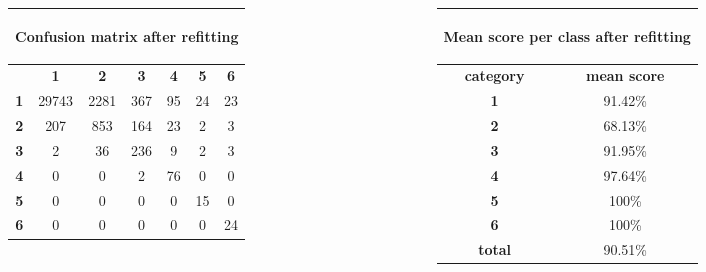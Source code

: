 \documentclass[c]{beamer}
\begin{document}
\begin{frame}
\begin{columns}
\begin{column}{0.7\textwidth}
  \begin{table}
  \begin{center}
  \begin{adjustbox}{max width=0.6\textwidth}
  {\tiny
  \begin{tabular}{|c|c|c|c|c|c|c|}
    \hline
    \multicolumn{7}{|c|}{{\tiny \begin{bf}Confusion matrix after refitting\end{bf}}} \\
    \hline
     & \textbf{1} & \textbf{2} & \textbf{3} & \textbf{4} & \textbf{5} & \textbf{6}\\
    \hline
    \textbf{1} & 29743 & 2281 & 367 & 95 & 24 & 23\\
    \hline
    \textbf{2} & 207 & 853 & 164 & 23 & 2 & 3\\
    \hline
    \textbf{3} & 2 & 36 & 236 & 9 & 2 & 3\\
    \hline
    \textbf{4} & 0 & 0 & 2 & 76 & 0 & 0\\
    \hline
    \textbf{5} & 0 & 0 & 0 & 0 & 15 & 0\\
    \hline
    \textbf{6} & 0 & 0 & 0 & 0 & 0 & 24\\
    \hline
  \end{tabular}
  }
  \end{adjustbox}
  \end{center}
  \end{table}
\end{column}
\begin{column}{0.5\textwidth}
   \begin{table}
    \begin{center}
    \begin{adjustbox}{max width=0.5\textwidth}
    {\tiny 
    \begin{tabular}{|c|c|}
      \hline
      \multicolumn{2}{|c|}{\begin{bf}Mean score per class after refitting\end{bf}} \\
      \hline
      \textbf{category} & \textbf{mean score}\\
      \hline
      \textbf{1} & 91.42\% \\
      \hline
      \textbf{2} & 68.13\% \\
      \hline
      \textbf{3} & 91.95\% \\
      \hline
      \textbf{4} & 97.64\% \\
      \hline
      \textbf{5} & 100\% \\
      \hline
      \textbf{6} & 100\% \\
      \hline
      \textbf{total} & 90.51\% \\
      \hline
    \end{tabular}
    }
    \end{adjustbox}
    \end{center}
  \end{table}
\end{column}
\end{columns}
\end{frame}
\end{document}

